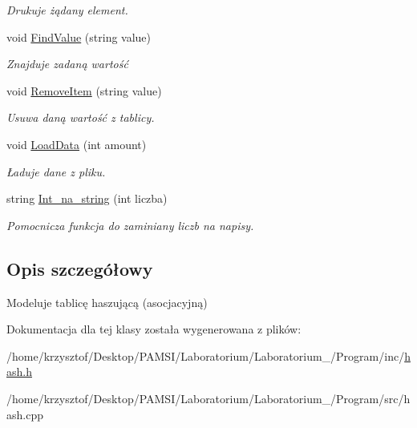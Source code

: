 \begin{DoxyCompactItemize}
\begin{DoxyCompactList}\small\item\em \-Drukuje żądany element. \end{DoxyCompactList}\item 
\hypertarget{classhasz_a056694477f1d1c398954748f9ab51c3e}{void \hyperlink{classhasz_a056694477f1d1c398954748f9ab51c3e}{\-Find\-Value} (string value)}\label{classhasz_a056694477f1d1c398954748f9ab51c3e}

\begin{DoxyCompactList}\small\item\em \-Znajduje zadaną wartość \end{DoxyCompactList}\item 
\hypertarget{classhasz_ac6f62d20115c5927caafcd3fe91941b8}{void \hyperlink{classhasz_ac6f62d20115c5927caafcd3fe91941b8}{\-Remove\-Item} (string value)}\label{classhasz_ac6f62d20115c5927caafcd3fe91941b8}

\begin{DoxyCompactList}\small\item\em \-Usuwa daną wartość z tablicy. \end{DoxyCompactList}\item 
\hypertarget{classhasz_ad5c5bbdf873534ca6c49e077204e73ee}{void \hyperlink{classhasz_ad5c5bbdf873534ca6c49e077204e73ee}{\-Load\-Data} (int amount)}\label{classhasz_ad5c5bbdf873534ca6c49e077204e73ee}

\begin{DoxyCompactList}\small\item\em Ładuje dane z pliku. \end{DoxyCompactList}\item 
\hypertarget{classhasz_aa88fe95f1bd60cb0f02bd38fc36ef2ee}{string \hyperlink{classhasz_aa88fe95f1bd60cb0f02bd38fc36ef2ee}{\-Int\-\_\-na\-\_\-string} (int liczba)}\label{classhasz_aa88fe95f1bd60cb0f02bd38fc36ef2ee}

\begin{DoxyCompactList}\small\item\em \-Pomocnicza funkcja do zaminiany liczb na napisy. \end{DoxyCompactList}\end{DoxyCompactItemize}


\subsection{\-Opis szczegółowy}
\-Modeluje tablicę haszującą (asocjacyjną) 

\-Dokumentacja dla tej klasy została wygenerowana z plików\-:\begin{DoxyCompactItemize}
\item 
/home/krzysztof/\-Desktop/\-P\-A\-M\-S\-I/\-Laboratorium/\-Laboratorium\-\_/\-Program/inc/\hyperlink{hash_8h}{hash.\-h}\item 
/home/krzysztof/\-Desktop/\-P\-A\-M\-S\-I/\-Laboratorium/\-Laboratorium\-\_/\-Program/src/hash.\-cpp\end{DoxyCompactItemize}
